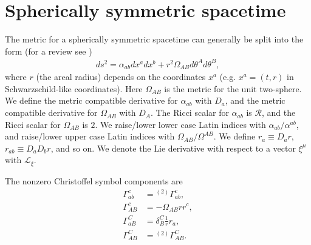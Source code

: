 \documentclass[12pt]{report}
\begin{document}
\section{Spherically symmetric spacetime}
The metric for a spherically symmetric spacetime can generally be split
into the form (for a review see \cite{Abreu:2010ru})
\begin{align}
    \label{eq:general_spherical_sym_metric}
    \boxed{
        ds^2
        =
        \alpha_{ab}dx^adx^b
        +
        r^2\Omega_{AB}d\theta^Ad\theta^B
        ,
    }
\end{align}
where $r$ (the areal radius) depends on the coordinates $x^a$
(e.g. $x^a=(t,r)$ in Schwarzschild-like coordinates).
Here $\Omega_{AB}$ is the metric for the unit two-sphere.
We define the metric compatible derivative for $\alpha_{ab}$ with $D_a$,
and the metric compatible derivative for $\Omega_{AB}$ with $D_A$.
The Ricci scalar for $\alpha_{ab}$ is $\mathcal{R}$, and the
Ricci scalar for $\Omega_{AB}$ is $2$.
We raise/lower lower case Latin indices with $\alpha_{ab}/\alpha^{ab}$, 
and raise/lower upper case Latin indices with $\Omega_{AB}/\Omega^{AB}$.
We define $r_a\equiv D_ar$, $r_{ab}\equiv D_aD_br$, and so on.
We denote the Lie derivative with respect to a vector $\xi^{\mu}$ with
$\mathcal{L}_{\xi}$.

The nonzero Christoffel symbol components are
\begin{subequations}
\label{eq:chr_sym_spherical_sym}
\begin{align}
    \Gamma^c_{ab}
    &=
    {}^{(2)}\Gamma^c_{ab}
    ,\\
    \Gamma^c_{AB}
    &=
    -
    \Omega_{AB} r r^c
    ,\\
    \Gamma^C_{aB}
    &=
    \delta^C_B\frac{1}{r}r_a
    ,\\
    \Gamma^C_{AB}
    &=
    {}^{(2)}\Gamma^C_{AB}
    .
\end{align}
\end{subequations}
\end{document}

